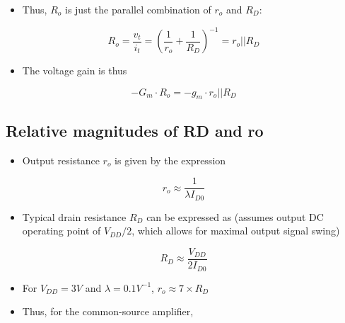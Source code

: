 \documentclass[11pt]{article}
\providecommand{\tightlist}{%
      \setlength{\itemsep}{0pt}\setlength{\parskip}{0pt}}
\begin{document}
\begin{itemize}
\tightlist
\item
  Thus, \(R_o\) is just the parallel combination of \(r_o\) and \(R_D\):
\end{itemize}

\begin{equation}
R_o = \dfrac{v_t}{i_t} = \left(\dfrac{1}{r_o}+ \dfrac{1}{R_D} \right)^{-1} = \boxed{r_o || R_D}
\end{equation}

\begin{itemize}
\tightlist
\item
  The voltage gain is thus
\end{itemize}

\begin{equation}
-G_m \cdot R_o = -g_m \cdot r_o || R_D
\end{equation}

    \hypertarget{relative-magnitudes-of-rd-and-ro}{%
\subsection{Relative magnitudes of RD and
ro}\label{relative-magnitudes-of-rd-and-ro}}

    \begin{itemize}
\tightlist
\item
  Output resistance \(r_o\) is given by the expression
\end{itemize}

\begin{equation}
r_o \approx \dfrac{1}{\lambda I_{D0}}
\end{equation}

\begin{itemize}
\tightlist
\item
  Typical drain resistance \(R_D\) can be expressed as (assumes output
  DC operating point of \(V_{DD}/2\), which allows for maximal output
  signal swing)
\end{itemize}

\begin{equation}
R_D \approx \dfrac{V_{DD}}{2I_{D0}}
\end{equation}

\begin{itemize}
\tightlist
\item
  For \(V_{DD} = 3V\) and \(\lambda = 0.1V^{-1}\),
  \(r_o \approx 7 \times R_D\)
\item
  Thus, for the common-source amplifier,
\end{itemize}
\end{document}
